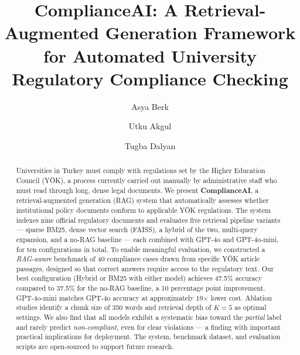 \documentclass[a4paper,fleqn]{cas-dc}
\begin{document}
\let\WriteBookmarks\relax
\def\floatpagepagefraction{1}
\def\textpagefraction{.001}

\title[mode=title]{ComplianceAI: A Retrieval-Augmented Generation Framework
  for Automated University Regulatory Compliance Checking}

\author[1]{Asya Berk}

\author[1]{Utku Akgul}

\author[1]{Tugba Dalyan}
\cormark[1]
\fnmark[1]



\begin{abstract}
Universities in Turkey must comply with regulations set by the Higher Education Council
(YÖK), a process currently carried out manually by administrative staff who must read
through long, dense legal documents. We present \textbf{ComplianceAI}, a
retrieval-augmented generation (RAG) system that automatically assesses whether
institutional policy documents conform to applicable YÖK regulations. The system indexes
nine official regulatory documents and evaluates five retrieval pipeline variants ---
sparse BM25, dense vector search (FAISS), a hybrid of the two, multi-query expansion,
and a no-RAG baseline --- each combined with GPT-4o and GPT-4o-mini, for ten
configurations in total. To enable meaningful evaluation, we constructed a
\textit{RAG-aware} benchmark of 40 compliance cases drawn from specific YÖK article
passages, designed so that correct answers require access to the regulatory text. Our
best configuration (Hybrid or BM25 with either model) achieves 47.5\% accuracy compared
to 37.5\% for the no-RAG baseline, a 10 percentage point improvement. GPT-4o-mini
matches GPT-4o accuracy at approximately 19$\times$ lower cost. Ablation studies
identify a chunk size of 350 words and retrieval depth of $K{=}5$ as optimal settings.
We also find that all models exhibit a systematic bias toward the \textit{partial} label
and rarely predict \textit{non-compliant}, even for clear violations --- a finding with
important practical implications for deployment. The system, benchmark dataset, and
evaluation scripts are open-sourced to support future research.
\end{abstract}
\end{document}

